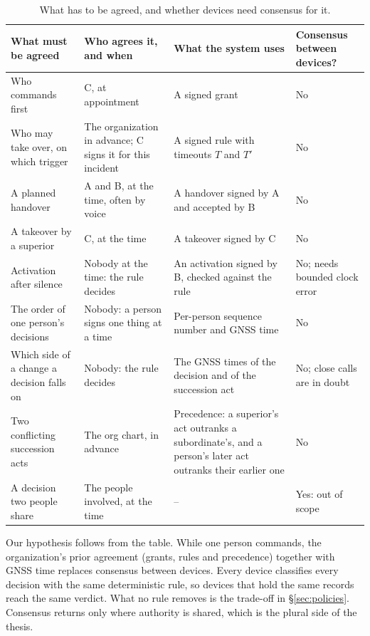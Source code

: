 \documentclass[11pt,a4paper]{article}
\begin{document}
\begin{table}[htbp]
\centering
\caption{What has to be agreed, and whether devices need consensus for it.}
\label{tab:agreement}
\small
\begin{tabularx}{\linewidth}{@{}P{3.5cm}P{3.6cm}LP{2.4cm}@{}}
\toprule
\textbf{What must be agreed} & \textbf{Who agrees it, and when} & \textbf{What the system uses} &
  \textbf{Consensus between devices?} \\
\midrule
Who commands first & C, at appointment & A signed grant & No \\
Who may take over, on which trigger & The organization in advance; C signs it for this
  incident & A signed rule with timeouts $T$ and $T'$ & No \\
A planned handover & A and B, at the time, often by voice & A handover signed by A and
  accepted by B & No \\
A takeover by a superior & C, at the time & A takeover signed by C & No \\
Activation after silence & Nobody at the time: the rule decides & An activation signed by B,
  checked against the rule & No; needs bounded clock error \\
The order of one person's decisions & Nobody: a person signs one thing at a time &
  Per-person sequence number and GNSS time & No \\
Which side of a change a decision falls on & Nobody: the rule decides & The GNSS times of the
  decision and of the succession act & No; close calls are in doubt \\
Two conflicting succession acts & The org chart, in advance & Precedence: a superior's act
  outranks a subordinate's, and a person's later act outranks their earlier one & No \\
A decision two people share & The people involved, at the time & -- & Yes: out of scope \\
\bottomrule
\end{tabularx}
\end{table}

Our hypothesis follows from the table. While one person commands, the organization's prior
agreement (grants, rules and precedence) together with GNSS time replaces consensus between
devices. Every device classifies every decision with the same deterministic rule, so devices
that hold the same records reach the same verdict. What no rule removes is the trade-off in
\S\ref{sec:policies}. Consensus returns only where authority is shared, which is the plural
side of the thesis.
\end{document}

